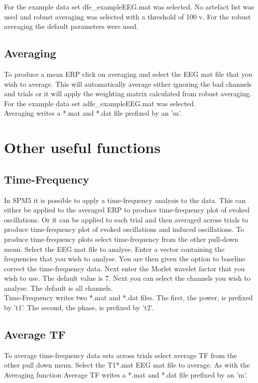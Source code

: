 For the example data set dfe\_exampleEEG.mat was selected. No artefact
list was used and robust averaging was selected with a threshold of
100  v. For the robust averaging the default parameters were used.

\subsection{Averaging}
To produce a mean ERP click on averaging and select the EEG mat file
that you wish to average. This will automatically average either
ignoring the bad channels and trials or it will apply the weighting
matrix calculated from robust averaging. For the example data set
adfe\_exampleEEG.mat was selected.\\

Averaging writes a *.mat and *.dat file prefixed by an 'm'. 

\section{Other useful functions}
\subsection{Time-Frequency}
In SPM5 it is possible to apply a time-frequency analysis to the
data. This can either be applied to the averaged ERP to produce
time-frequency plot of evoked oscillations. Or it can be applied to
each trial and then averaged across trials to produce time-frequency
plot of evoked oscillations and induced oscillations. To produce
time-frequency plots select time-frequency from the other pull-down
menu. Select the EEG mat file to analyse. Enter a vector containing
the frequencies that you wish to analyse. You are then given the
option to baseline correct the time-frequency data. Next enter the
Morlet wavelet factor that you wish to use. The default value is
7. Next you can select the channels you wish to analyse. The default
is all channels.\\

Time-Frequency writes two *.mat and *.dat files. The first, the power,
is prefixed by 't1'. The second, the phase, is  prefixed by 't2'.

\subsection{Average TF}
To average time-frequency data sets across trials select average TF
from the other pull down menu. Select the T1*.mat EEG mat file to
average. As with the Averaging function Average TF writes a *.mat and
*.dat file prefixed by an 'm'.
